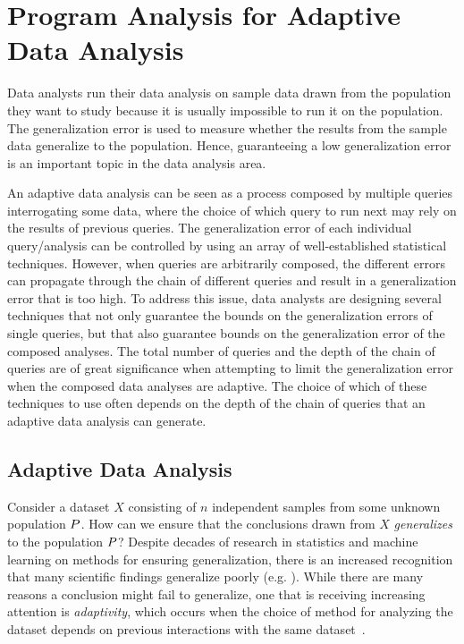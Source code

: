 \chapter{Program Analysis for Adaptive Data Analysis}
\label{ch:adapt_intro}


Data analysts run their data analysis on sample data drawn from the population they want to study because it is usually impossible to run it on the population. The generalization error is used to measure whether the results from the sample data generalize to the population. Hence, guaranteeing a low generalization error is an important topic in the data analysis area. 

An adaptive data analysis can be seen as a process composed by multiple queries interrogating some data, where the choice of which query to run next may rely on the results of previous queries. The generalization error of each individual query/analysis can be controlled by using an array of well-established statistical techniques. However, when queries are arbitrarily composed, the different errors can propagate through the chain of different queries and result in a generalization error that is too high. To address this issue, data analysts are designing several techniques that not only guarantee the bounds on the generalization errors of single queries, but that also guarantee bounds on the generalization error of the composed analyses. 
The total number of queries and the depth of the chain of queries are of great significance when attempting to limit the generalization error when the composed data analyses are adaptive. 
The choice of which of these techniques to use often depends on the depth of the chain of queries that an adaptive data analysis can generate.   %

\section{Adaptive Data Analysis}
\label{sec:adapt-backgroung}
Consider a dataset $X$ consisting of $n$ independent samples from some unknown population $P$.  How can we ensure that the conclusions drawn from $X$ \emph{generalizes} to the population $P$?  Despite decades of research in statistics and machine learning on methods for ensuring generalization, there is an increased recognition that many scientific findings generalize poorly (e.g. 
\cite{Ioannidis05,GelmanL13}
).  While there are many reasons a conclusion might fail to generalize, one that is receiving increasing attention is \emph{adaptivity}, which occurs when the choice of method for analyzing the dataset depends on previous interactions with the same dataset~\cite{GelmanL13}.

